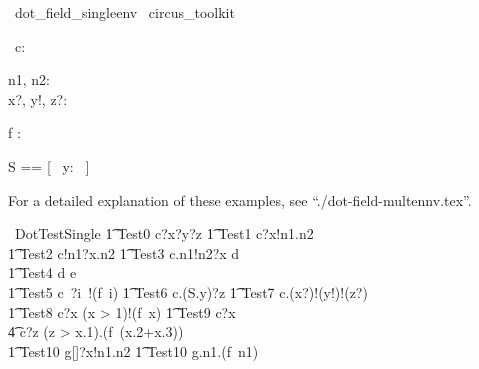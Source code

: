 \begin{zsection}
  \SECTION\ dot\_field\_singleenv \parents\ circus\_toolkit
\end{zsection}
\begin{circus}
   \circchannel\ c: \nat \cross \nat \cross \nat \cross \nat
\end{circus}

\begin{axdef}
   n1, n2: \nat \\
   x?, y!, z?: \nat
\end{axdef}

\begin{axdef}
   f : \nat \fun \nat \cross \nat
\end{axdef}

\begin{zed}
   S == [~ y: \nat ~]
\end{zed}

For a detailed explanation of these examples, see ``./dot-field-multennv.tex''.
%
\begin{circus}
  \circprocess\ DotTestSingle \circdef \circbegin
  \also %
   \t1 Test0 \circdef c?x?y?z \then \Skip
   \also
   \t1 Test1 \circdef c?x!n1.n2 \then \Skip \\
   \t1 Test2 \circdef c!n1?x.n2 \then \Skip
   \also
   \t1 Test3 \circdef c.n1!n2?x \then d \Skip \\   
   \t1 Test4 \circdef d \then e \then \Skip \\
   \t1 Test5 \circdef c~?i~!(f~i) \then \Skip
       \also
   \t1 Test6 \circdef c.(S.y)?z \then \Skip
       \also
   \t1 Test7 \circdef c.(x?)!(y!)!(z?) \then \Skip \\
   \t1 Test8 \circdef c?x \prefixcolon (x > 1)!(f~x) \then \Skip
    \also
   \t1 Test9 \circdef c?x \then \\
                  \t4 c?z \prefixcolon (z > x.1).(f~(x.2+x.3)) \then \Skip \\
   \t1 Test10 \circdef g[\nat \cross \nat \cross \nat]?x!n1.n2 \then \Skip
        \also
   \t1 Test10 \circdef g.n1.(f~n1) \then \Skip \\   
   \circspot \Skip \\
   \circend
\end{circus}


